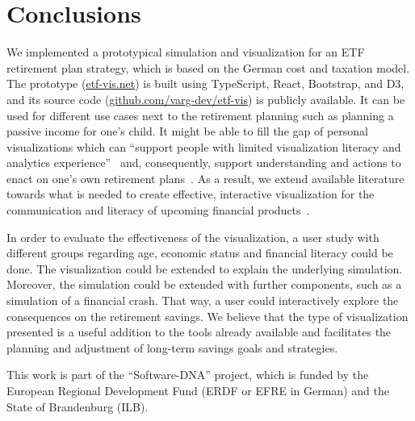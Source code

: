 \documentclass[sigconf%
,natbib=true%
]{acmart}
\begin{document}
\section{Conclusions}
We implemented a prototypical simulation and visualization for an ETF retirement plan strategy, which is based on the German cost and taxation model. 
The prototype (\href{https://etf-vis.net}{etf-vis.net}) is built using TypeScript, React, Bootstrap, and D3, and its source code (\href{https://github.com/varg-dev/etf-vis}{github.com/varg-dev/etf-vis}) is publicly available.
It can be used for different use cases next to the retirement planning such as planning a passive income for one's child.
It might be able to fill the gap of personal visualizations which can \enquote{support people with limited visualization literacy and analytics experience}~\cite{huang2015-personal} and, consequently, support understanding and actions to enact on one's own retirement plans~\cite{pandey2014-power}. 
As a result, we extend available literature towards what is needed to create effective, interactive visualization for the communication and literacy of upcoming financial products~\cite{lusardi2017-narratives}. 

In order to evaluate the effectiveness of the visualization, a user study with different groups regarding age, economic status and financial literacy could be done. 
The visualization could be extended to explain the underlying simulation. 
Moreover, the simulation could be extended with further components, such as a simulation of a financial crash. 
That way, a user could interactively explore the consequences on the retirement savings.
We believe that the type of visualization presented is a useful addition to the tools already available and facilitates the planning and adjustment of long-term savings goals and strategies.

\begin{acks}
    This work is part of the \enquote{Software-DNA} project, which is funded by the European Regional Development Fund (ERDF or EFRE in German) and the State of Brandenburg (ILB).
\end{acks}

\balance


\end{document}
